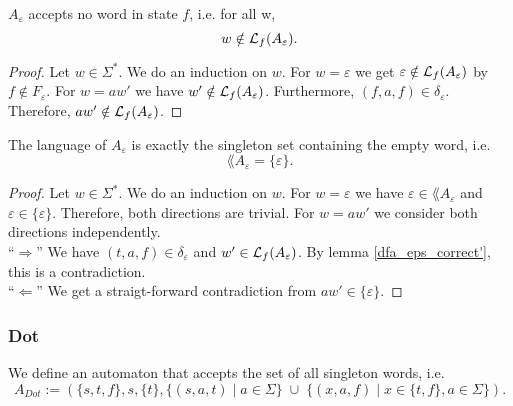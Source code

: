 \begin{lemma}
    \label{dfa_eps_correct'}
    $A_\varepsilon$ accepts no word in state $f$, i.e. for all w,
    \begin{equation*}
        w \notin \mathcal{L}_{f}(A_\varepsilon).
    \end{equation*}
\end{lemma}
\begin{proof}
    Let $w \in \Sigma^*$.
    We do an induction on $w$. 
    For $w = \varepsilon$ we get $\varepsilon \notin \mathcal{L}_{f}(A_\varepsilon)$ by $f \notin F_\varepsilon$. 
    For $w = aw'$ we have $w' \notin \mathcal{L}_{f}(A_\varepsilon)$. 
    Furthermore, $(f, a, f) \in \delta_\varepsilon$.
    Therefore, $aw' \notin \mathcal{L}_{f}(A_\varepsilon)$.
\end{proof}

\begin{lemma}
    \label{dfa_eps_correct}
    The language of $A_\varepsilon$ is exactly the singleton set containing the empty word, i.e.
    \begin{equation*}
        \lang{A_\varepsilon} = \{\varepsilon\}.
    \end{equation*}
\end{lemma}

\begin{proof}
    Let $w \in \Sigma^*$.
    We do an induction on $w$. 
    For $w = \varepsilon$ we have $\varepsilon \in \lang{A_\varepsilon}$ and $\varepsilon \in \{\varepsilon\}$.
    Therefore, both directions are trivial.
    For $w = aw'$ we consider both directions independently. \\
    ``$\Rightarrow$'' We have $(t, a, f) \in \delta_\varepsilon$ and $w' \in \mathcal{L}_{f}(A_\varepsilon)$. By lemma \ref{dfa_eps_correct'}, this is a contradiction. \\
    ``$\Leftarrow$'' We get a straigt-forward contradiction from $aw' \in \{\varepsilon\}$.
\end{proof}



\subsubsection{Dot}
\begin{definition}
    We define an automaton that accepts the set of all singleton words, i.e.
    \begin{equation*}
        A_{Dot} := (\{s, t, f\}, s, \{t\}, 
        \{(s, a, t) \; | \; a \in \Sigma\}
        \; \cup \;
        \{(x, a, f) \; | \; x \in \{t, f\}, a \in \Sigma\}
        ).
    \end{equation*}
\end{definition}

